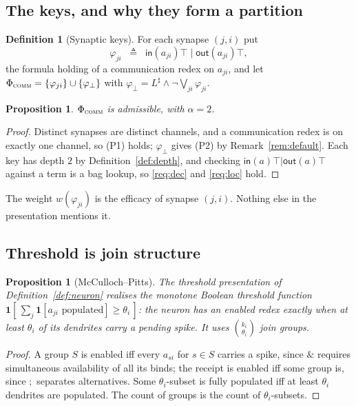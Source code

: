 \documentclass[11pt,a4paper]{article}
\theoremstyle{plain}
\newtheorem{proposition}[theorem]{Proposition}
\theoremstyle{definition}
\newtheorem{definition}[theorem]{Definition}
\theoremstyle{remark}
\newcommand{\sepc}{\mathbin{\big|}}
\newcommand{\out}{\mathsf{out}}
\newcommand{\inn}{\mathsf{in}}
\newcommand{\wmap}{w}
\begin{document}
\subsection{The keys, and why they form a partition}

\begin{definition}[Synaptic keys]
\label{def:synkeys}
For each synapse $(j,i)$ put
\[
\varphi_{ji} \;\;\triangleq\;\; \inn(a_{ji})\top \;\sepc\; \out(a_{ji})\top ,
\]
the formula holding of a communication redex on $a_{ji}$, and let
$\Phi_{\textsc{comm}} = \{\varphi_{ji}\} \cup \{\varphi_\bot\}$ with
$\varphi_\bot = L^\sharp \wedge \neg\bigvee_{ji}\varphi_{ji}$.
\end{definition}

\begin{proposition}
\label{prop:rnn-admissible}
$\Phi_{\textsc{comm}}$ is admissible, with $\alpha = 2$.
\end{proposition}

\begin{proof}
Distinct synapses are distinct channels, and a communication redex is on exactly one channel, so
(P1) holds; $\varphi_\bot$ gives (P2) by Remark~\ref{rem:default}. Each key has depth $2$ by
Definition~\ref{def:depth}, and checking $\inn(a)\top \sepc \out(a)\top$ against a term is a bag
lookup, so \ref{req:dec} and \ref{req:loc} hold.
\end{proof}

The weight $\wmap(\varphi_{ji})$ is the efficacy of synapse $(j,i)$. Nothing else in the presentation
mentions it.

\subsection{Threshold is join structure}

\begin{proposition}[McCulloch--Pitts]
\label{prop:mcp}
The threshold presentation of Definition~\ref{def:neuron} realises the monotone Boolean threshold
function $\mathbf{1}[\,\sum_{j} \mathbf{1}[a_{ji}\text{ populated}] \geq \theta_i\,]$: the neuron has
an enabled redex exactly when at least $\theta_i$ of its dendrites carry a pending spike. It uses
$\binom{k_i}{\theta_i}$ join groups.
\end{proposition}

\begin{proof}
A group $S$ is enabled iff every $a_{si}$ for $s \in S$ carries a spike, since $\&$ requires
simultaneous availability of all its binds; the receipt is enabled iff some group is, since $;$
separates alternatives. Some $\theta_i$-subset is fully populated iff at least $\theta_i$ dendrites
are populated. The count of groups is the count of $\theta_i$-subsets.
\end{proof}
\end{document}
